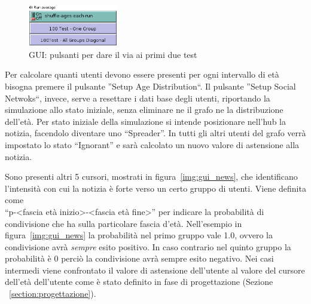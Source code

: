 \begin{figure}
  \vspace*{-20pt}
  \begin{center}
    \includegraphics[width=0.35\textwidth]{img/gui-first-second-test.png}
  \end{center}
 \vspace*{-10pt}
 \caption{GUI: 
 pulsanti per dare il via ai primi due test}
 \vspace*{-10pt}
 \label{img:gui_first_second_test}
\end{figure}
Per calcolare quanti utenti devono essere presenti per ogni intervallo di età bisogna premere il pulsante ''Setup Age Distribution``.
Il pulsante ''Setup Social Netwoks``, invece, serve a resettare i dati base degli utenti, riportando la simulazione 
allo stato iniziale, senza eliminare ne il grafo ne la distribuzione dell'età.
Per stato iniziale della simulazione si intende posizionare nell'hub la notizia, facendolo diventare uno ``Spreader''.
In tutti gli altri utenti del grafo verrà impostato lo stato ``Ignorant'' e sarà calcolato un nuovo valore di 
astensione alla notizia.

Sono presenti altri 5 cursori, mostrati in figura~\ref{img:gui_news}, che identificano l'intensità con cui la notizia è forte 
verso un certo gruppo di utenti. 
Viene definita come\\
``p-<fascia età inizio>-<fascia età fine>'' per indicare la probabilità di condivisione che ha sulla particolare
fascia d'età.
Nell'esempio in figura~\ref{img:gui_news} la probabilità nel primo gruppo vale 1.0, ovvero la condivisione avrà \emph{sempre} esito positivo.
In caso contrario nel quinto gruppo la probabilità è 0 perciò la condivisione avrà sempre esito negativo. 
Nei casi intermedi viene confrontato il valore di astensione dell'utente al valore del cursore dell'età dell'utente come è stato definito 
in fase di progettazione (Sezione ~\ref{section:progettazione}).















